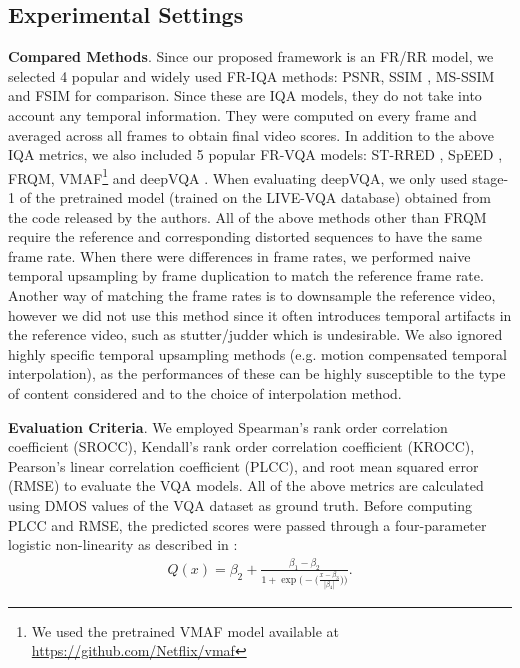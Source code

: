 \documentclass[journal]{IEEEtran}
\newcommand{\eg}{{e}.{g}.}
\begin{document}
\subsection{Experimental Settings}
\textbf{Compared Methods}.
Since our proposed framework is an FR/RR model, we selected 4 popular and widely used FR-IQA methods: PSNR, SSIM \cite{wang2004image}, MS-SSIM \cite{wang2003multiscale} and FSIM \cite{zhang2011fsim} for comparison. Since these are IQA models, they do not take into account any temporal information. They were computed on every frame and averaged across all frames to obtain final video scores. In addition to the above IQA metrics, we also included 5 popular FR-VQA models: ST-RRED \cite{soundararajan2012video}, SpEED \cite{bampis2017speed}, FRQM\cite{zhang2017frame}, VMAF\footnote{We used the pretrained VMAF model available at \url{https://github.com/Netflix/vmaf}} \cite{VMAF2016} and deepVQA \cite{kim2018deep}. When evaluating deepVQA, we only used stage-1 of the pretrained model (trained on the LIVE-VQA \cite{seshadrinathan2010study} database) obtained from the code released by the authors. All of the above methods other than FRQM require the reference and corresponding distorted sequences to have the same frame rate. When there were differences in frame rates, we performed naive temporal upsampling by frame duplication to match the reference frame rate. Another way of matching the frame rates is to downsample the reference video, however we did not use this method since it often introduces temporal artifacts in the reference video, such as stutter/judder which is undesirable. We also ignored highly specific temporal upsampling methods (\eg{} motion compensated temporal interpolation), as the performances of these can be highly susceptible to the type of content considered and to the choice of interpolation method.

\textbf{Evaluation Criteria}.
We employed Spearman's rank order correlation coefficient (SROCC), Kendall's rank order correlation coefficient (KROCC), Pearson's linear correlation coefficient (PLCC), and root mean squared error (RMSE) to evaluate the VQA models. All of the above metrics are calculated using DMOS values of the VQA dataset as ground truth. Before computing PLCC and RMSE, the predicted scores were passed through a four-parameter logistic non-linearity as described in \cite{VQEG2000}:
\begin{align}
    Q(x) = \beta_2 + \frac{\beta_1 - \beta_2}{1 + \exp\Bigg(-\Big(\frac{x - \beta_3}{|\beta_4|}\Big)\Bigg)}.
    \label{eqn:logistic_non}
\end{align}
\end{document}
